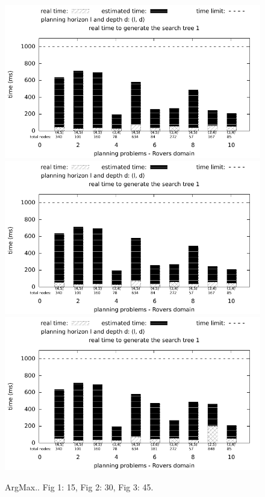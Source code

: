 \documentclass[10pt,a4paper,onecolumn]{article}
\begin{document}
\begin{figure}[hbt]
	\begin{center}
		\begin{changemargin}{-5.3cm}{1cm}
			\small
			\includegraphics[totalheight=8cm]{MORE_ACTIONS_LESS_DEPTH_T1-3/15/MEDIANTIME-MORE_ACTIONS_LESS_DEPTH-T1-15.pdf} 
			\includegraphics[totalheight=8cm]{MORE_ACTIONS_LESS_DEPTH_T1-3/30/MEDIANTIME-MORE_ACTIONS_LESS_DEPTH-T1-30.pdf} 
			\includegraphics[totalheight=8cm]{MORE_ACTIONS_LESS_DEPTH_T1-3/45/MEDIANTIME-MORE_ACTIONS_LESS_DEPTH-T1-45.pdf} 
		\end{changemargin}
		\caption{ArgMax.. Fig 1: 15, Fig 2: 30, Fig 3: 45.}
	\end{center}
	\label{fig:2}
\end{figure}

%
%
\end{document}
